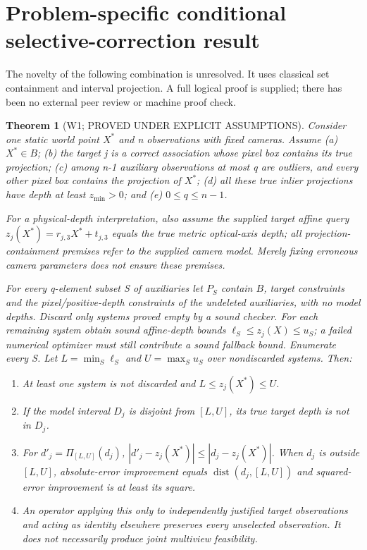\documentclass[11pt]{article}
\newtheorem{theorem}{Theorem}
\begin{document}
\section*{Problem-specific conditional selective-correction result}
The novelty of the following combination is unresolved. It uses classical set containment and interval projection. A full logical proof is supplied; there has been no external peer review or machine proof check.

\begin{theorem}[W1; PROVED UNDER EXPLICIT ASSUMPTIONS]
Consider one static world point $X^*$ and n observations with fixed cameras. Assume (a) $X^*\in B$; (b) the target j is a correct association whose pixel box contains its true projection; (c) among n-1 auxiliary observations at most q are outliers, and every other pixel box contains the projection of $X^*$; (d) all these true inlier projections have depth at least $z_{\min}>0$; and (e) $0\le q\le n-1$.

For a physical-depth interpretation, also assume the supplied target affine query $z_j(X^*)=r_{j,3}X^*+t_{j,3}$ equals the true metric optical-axis depth; all projection-containment premises refer to the supplied camera model. Merely fixing erroneous camera parameters does not ensure these premises.

For every q-element subset S of auxiliaries let $P_S$ contain $B$, target constraints and the pixel/positive-depth constraints of the undeleted auxiliaries, with no model depths. Discard only systems proved empty by a sound checker. For each remaining system obtain sound affine-depth bounds $\ell_S\le z_j(X)\le u_S$; a failed numerical optimizer must still contribute a sound fallback bound. Enumerate every S. Let $L=\min_S\ell_S$ and $U=\max_S u_S$ over nondiscarded systems. Then:
\begin{enumerate}
\item At least one system is not discarded and $L\le z_j(X^*)\le U$.
\item If the model interval $D_j$ is disjoint from $[L,U]$, its true target depth is not in $D_j$.
\item For $d'_j=\Pi_{[L,U]}(d_j)$, $|d'_j-z_j(X^*)|\le|d_j-z_j(X^*)|$. When $d_j$ is outside $[L,U]$, absolute-error improvement equals $\operatorname{dist}(d_j,[L,U])$ and squared-error improvement is at least its square.
\item An operator applying this only to independently justified target observations and acting as identity elsewhere preserves every unselected observation. It does not necessarily produce joint multiview feasibility.
\end{enumerate}
\end{theorem}
\end{document}
